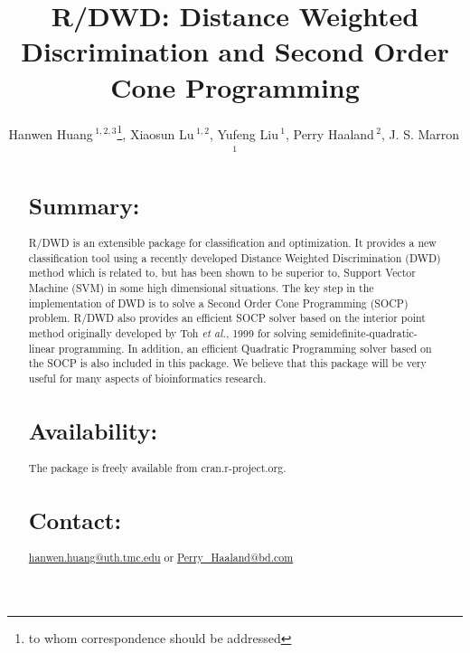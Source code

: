 \documentclass{bioinfo}
\begin{document}

\title[short Title]{R/DWD: Distance Weighted Discrimination and Second
  Order Cone Programming} \author[Sample \textit{et~al}]{Hanwen
  Huang\,$^{1,2,3}$\footnote{to whom correspondence should be
    addressed}, Xiaosun Lu\,$^{1,2}$, Yufeng Liu\,$^{1}$, Perry
  Haaland\,$^{2}$, J. S. Marron\,$^1$ \address{$^{1}$Department of
    Statistics and Operations Research, University of North Carolina
    at Chapel Hill, Chapel Hill, NC 27599 USA.\\ $^{2}$BD
    Technologies, 21 Davis Drive, RTP, NC 27709 USA.\\$^{3}$University
    of Texas Health Science Center at Houston, Houston, TX 77030
    USA.}}



\maketitle

\begin{abstract}

\section{Summary:}
R/DWD is an extensible package for classification and optimization. It
provides a new classification tool using a recently developed Distance
Weighted Discrimination (DWD) method which is related to, but has been
shown to be superior to, Support Vector Machine (SVM) in some high
dimensional situations.  The key step in the implementation of DWD is
to solve a Second Order Cone Programming (SOCP) problem. R/DWD also
provides an efficient SOCP solver based on the interior point method
originally developed by Toh {\em et al.}, 1999 for solving
semidefinite-quadratic-linear programming. In addition, an efficient
Quadratic Programming solver based on the SOCP is also included in
this package. We believe that this package will be very useful for
many aspects of bioinformatics research.

\section{Availability:} The package is freely available from cran.r-project.org.

\section{Contact:} \href{hanwen.huang@uth.tmc.edu}{hanwen.huang@uth.tmc.edu} or
\href{Perry\_Haaland@bd.com}{Perry\_Haaland@bd.com}
\end{abstract}
\end{document}
